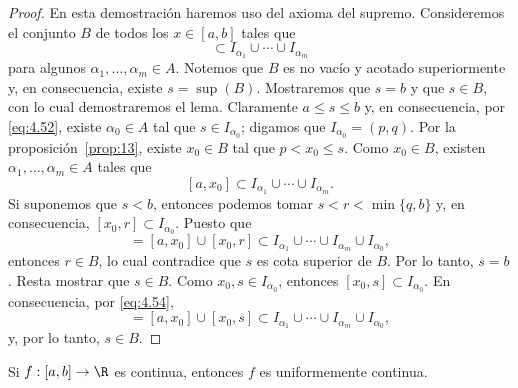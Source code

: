 \documentclass[12pt,a4paper]{book}
\begin{document}
    \begin{proof}
        En esta demostración haremos uso del axioma del supremo.
        Consideremos el conjunto $B$ de todos los $x\in[a,b]$ tales que
        \begin{equation*}
            [a,x]\subset I_{\alpha_{1}}\cup\cdots\cup I_{\alpha_{m}}
        \end{equation*}
        para algunos $\alpha_{1},\ldots,\alpha_{m}\in A$. Notemos que $B$ es no vacío y acotado
        superiormente y, en consecuencia, existe $s=\sup(B)$. Mostraremos que $s=b$ y
        que $s\in B$, con lo cual demostraremos el lema. Claramente $a\leq s\leq b$
        y, en consecuencia, por \eqref{eq:4.52}, existe $\alpha_{0}\in A$ tal que $s\in I_{\alpha_{0}}$; digamos que
        $I_{\alpha_{0}}=(p,q)$. Por la proposición~\ref{prop:13}, existe $x_{0}\in B$ tal que $p<x_{0}\leq s$. Como
        $x_{0}\in B$, existen $\alpha_{1},\ldots,\alpha_{m}\in A$ tales que
        \begin{equation}\label{eq:4.54}
            [a,x_{0}]\subset I_{\alpha_{1}}\cup\cdots\cup I_{\alpha_{m}}.
        \end{equation}
        Si suponemos que $s<b$, entonces podemos tomar $s<r<\min\{q,b\}$ y, en
        consecuencia, $[x_{0},r]\subset I_{\alpha_{0}}$. Puesto que
        \begin{equation*}
            [a,r]=[a,x_{0}]\cup[x_{0},r]\subset I_{\alpha_{1}}\cup\cdots\cup I_{\alpha_{m}}\cup I_{\alpha_{0}},
        \end{equation*}
        entonces $r\in B$, lo cual contradice que $s$ es cota superior de $B$. Por lo tanto,
        $s=b$. Resta mostrar que $s\in B$. Como $x_{0},s\in I_{\alpha_{0}}$, entonces $[x_{0},s]\subset I_{\alpha_{0}}$. En
        consecuencia, por \eqref{eq:4.54},
        \begin{equation*}
            [a,s]=[a,x_{0}]\cup[x_{0},s]\subset I_{\alpha_{1}}\cup\cdots\cup I_{\alpha_{m}}\cup I_{\alpha_{0}},
        \end{equation*}
        y, por lo tanto, $s\in B$.
    \end{proof}

    \begin{teorema}\label{teo:5}
        Si $f:[a,b]\to\R$ es continua,
        entonces $f$ es uniformemente continua.
    \end{teorema}
\end{document}
